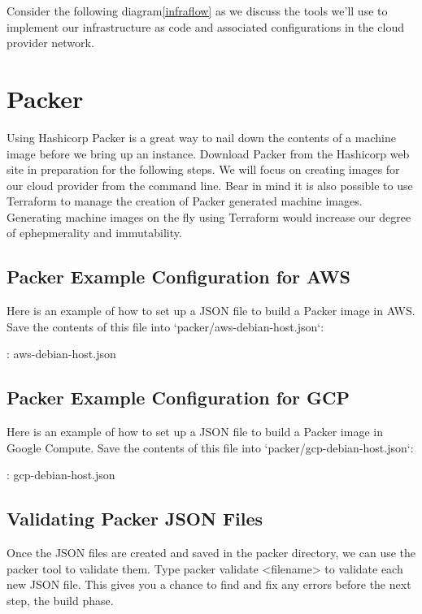 Consider the following diagram\ref{infraflow} as we discuss the tools we'll
use to implement our infrastructure as code and associated
configurations in the cloud provider network.

\section{Packer}

\justify{}
Using Hashicorp Packer is a great way to nail down the contents of a
machine image before we bring up an instance. Download Packer from the
Hashicorp web site in preparation for the following steps. 
We will focus on creating images for our cloud provider from the
command line. Bear in mind it is also possible to use Terraform to
manage the creation of Packer generated machine images. Generating
machine images on the fly using Terraform would increase our degree of
ephepmerality and immutability.

\subsection{Packer Example Configuration for AWS}
\justify{}
Here is an example of how to set up a JSON file to build a Packer image
in AWS. Save the contents of this file into
`packer/aws-debian-host.json`:

\justify{}
\begin{mybox}{\thetcbcounter: aws-debian-host.json}
	
\end{mybox}

\subsection{Packer Example Configuration for GCP}

\justify{}
Here is an example of how to set up a JSON file to build a Packer image
in Google Compute. Save the contents of this file into
`packer/gcp-debian-host.json`:

\justify{}
\begin{mybox}{\thetcbcounter: gcp-debian-host.json}
	
\end{mybox}


\subsection{Validating Packer JSON Files}

\justify{}
Once the JSON files are created and saved in the packer directory, we
can use the packer tool to validate them. Type
packer validate \textless{}filename\textgreater{} to validate each new
JSON file. This gives you a chance to find and fix any errors before the
next step, the build phase.

